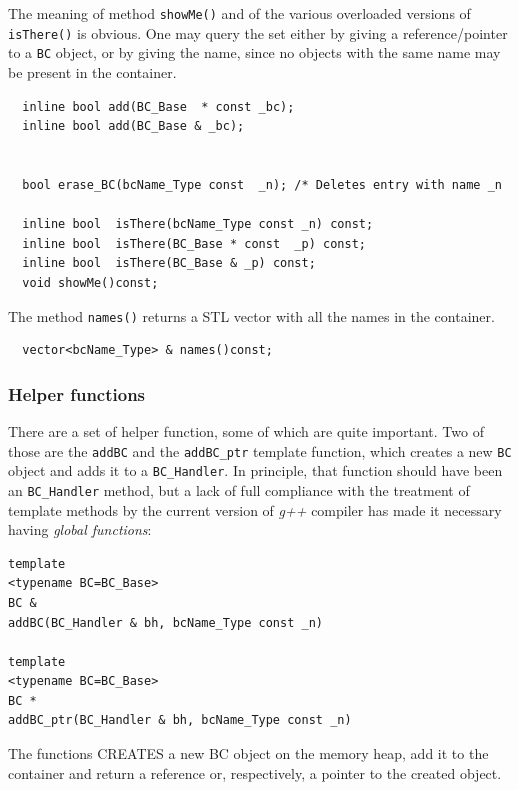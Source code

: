 The meaning of method \texttt{showMe()} and of the various overloaded versions
of \texttt{isThere()} is obvious. One may query the set either by giving
a reference/pointer to a \texttt{BC} object, or by giving the name, since no
objects with the same name may be present in the container. 
\begin{verbatim}
  inline bool add(BC_Base  * const _bc);
  inline bool add(BC_Base & _bc);

  
  bool erase_BC(bcName_Type const  _n); /* Deletes entry with name _n
  
  inline bool  isThere(bcName_Type const _n) const;
  inline bool  isThere(BC_Base * const  _p) const;
  inline bool  isThere(BC_Base & _p) const;
  void showMe()const;
\end{verbatim}  

The method \texttt{names()} returns a STL vector with all the names in the 
container.
\begin{verbatim}
  vector<bcName_Type> & names()const;
\end{verbatim}  
\subsubsection{Helper functions}
There are a set of helper function, some of which are quite important.
Two of those are the \texttt{addBC} and the \texttt{addBC\_ptr} template
function, which creates a new \texttt{BC} object and adds it to a
\texttt{BC\_Handler}.  In principle, that function should have been an
\texttt{BC\_Handler} method, but a lack of full compliance with the
treatment of template methods by the current version of \emph{g++}
compiler has made it necessary having \emph{global functions}:

\begin{verbatim}
template
<typename BC=BC_Base>
BC &
addBC(BC_Handler & bh, bcName_Type const _n)

template
<typename BC=BC_Base>
BC *
addBC_ptr(BC_Handler & bh, bcName_Type const _n)
\end{verbatim}

The functions CREATES a new BC object on the memory heap, add it to
the container and return a reference or, respectively, a pointer to
the created object.

